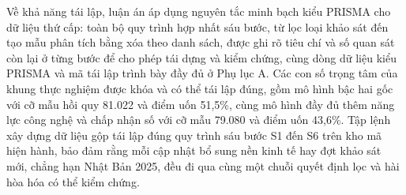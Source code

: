 \documentclass[
  a4paper,
  13pt]{extreport}
\begin{document}
Về khả năng tái lập, luận án áp dụng nguyên tắc minh bạch kiểu PRISMA
cho dữ liệu thứ cấp: toàn bộ quy trình hợp nhất sáu bước, từ lọc loại
khảo sát đến tạo mẫu phân tích bằng xóa theo danh sách, được ghi rõ tiêu
chí và số quan sát còn lại ở từng bước để cho phép tái dựng và kiểm
chứng, cùng dòng dữ liệu kiểu PRISMA và mã tái lập trình bày đầy đủ ở
Phụ lục A. Các con số trọng tâm của khung thực nghiệm được khóa và có
thể tái lập đúng, gồm mô hình bậc hai gốc với cỡ mẫu hồi quy 81.022 và
điểm uốn 51,5\%, cùng mô hình đầy đủ thêm năng lực công nghệ và chấp
nhận số với cỡ mẫu 79.080 và điểm uốn 43,6\%. Tập lệnh xây dựng dữ liệu
gộp tái lập đúng quy trình sáu bước S1 đến S6 trên kho mã hiện hành, bảo
đảm rằng mỗi cập nhật bổ sung nền kinh tế hay đợt khảo sát mới, chẳng
hạn Nhật Bản 2025, đều đi qua cùng một chuỗi quyết định lọc và hài hòa
hóa có thể kiểm chứng.
\end{document}

